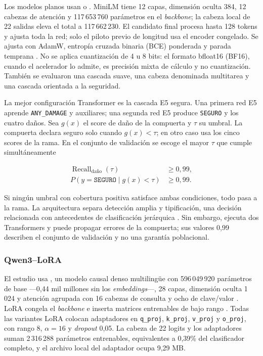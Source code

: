 Los modelos planos usan  o  \cite{wang2020minilm,wang2022e5,wang2024e5,hf2026minilmcard,hf2026e5card}. MiniLM tiene 12 capas, dimensión oculta 384, 12 cabezas de atención y 117\,653\,760 parámetros en el \emph{backbone}; la cabeza local de 22 salidas eleva el total a 117\,662\,230. El candidato final procesa hasta 128 tokens y ajusta toda la red; solo el piloto previo de longitud usa el encoder congelado. Se ajusta con AdamW, entropía cruzada binaria (BCE) ponderada y parada temprana \cite{loshchilov2019adamw,pytorch2026bce,prechelt1998earlystopping}. No se aplica cuantización de 4 u 8 bits: el formato bfloat16 (BF16), cuando el acelerador lo admite, es precisión mixta de cálculo y no cuantización. También se evaluaron una cascada suave, una cabeza denominada multitarea y una cascada orientada a la seguridad.

La mejor configuración Transformer es la cascada E5 segura. Una primera red E5 aprende \texttt{ANY\_DAMAGE} y auxiliares; una segunda red E5 produce \texttt{SEGURO} y los cuatro daños. Sea $g(x)$ el score de daño de la compuerta y $\tau$ su umbral. La compuerta declara seguro solo cuando $g(x)<\tau$; en otro caso usa los cinco scores de la rama. En el conjunto de validación se escoge el mayor $\tau$ que cumple simultáneamente

\[
\begin{aligned}
\operatorname{Recall}_{\text{daño}}(\tau)&\ge 0,99,\\
P(y=\texttt{SEGURO}\mid g(x)<\tau)&\ge 0,99.
\end{aligned}
\]

Si ningún umbral con cobertura positiva satisface ambas condiciones, todo pasa a la rama. La arquitectura separa detección amplia y tipificación, una decisión relacionada con antecedentes de clasificación jerárquica \cite{silla2011hierarchical}. Sin embargo, ejecuta dos Transformers y puede propagar errores de la compuerta; sus valores 0,99 describen el conjunto de validación y no una garantía poblacional.

\subsubsection{Qwen3--LoRA}

El estudio usa , un modelo causal denso multilingüe con 596\,049\,920 parámetros de base ---0,44 mil millones sin los \emph{embeddings}---, 28 capas, dimensión oculta 1\,024 y atención agrupada con 16 cabezas de consulta y ocho de clave/valor \cite{qwen2025qwen3,hf2026qwen06bcard}. LoRA congela el \emph{backbone} e inserta matrices entrenables de bajo rango \cite{hu2022lora}. Todas las variantes LoRA colocan adaptadores en \texttt{q\_proj}, \texttt{k\_proj}, \texttt{v\_proj} y \texttt{o\_proj}, con rango 8, $\alpha=16$ y \emph{dropout} 0,05. La cabeza de 22 logits y los adaptadores suman 2\,316\,288 parámetros entrenables, equivalentes a 0,39\% del clasificador completo, y el archivo local del adaptador ocupa 9,29 MB.

